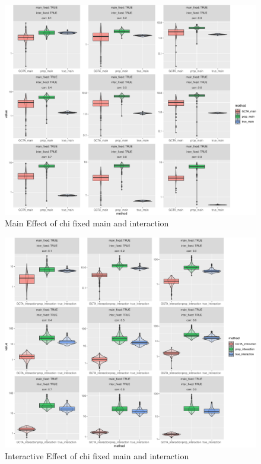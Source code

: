 \documentclass[]{article}
\begin{document}
\begin{figure}
\centering
\includegraphics{Simulation_report_files/figure-latex/main_fixed_fixed_chi-1.pdf}
\caption{Main Effect of chi fixed main and interaction}
\end{figure}

\begin{figure}
\centering
\includegraphics{Simulation_report_files/figure-latex/inter_fixed_fixed_chi-1.pdf}
\caption{Interactive Effect of chi fixed main and interaction}
\end{figure}
\end{document}
